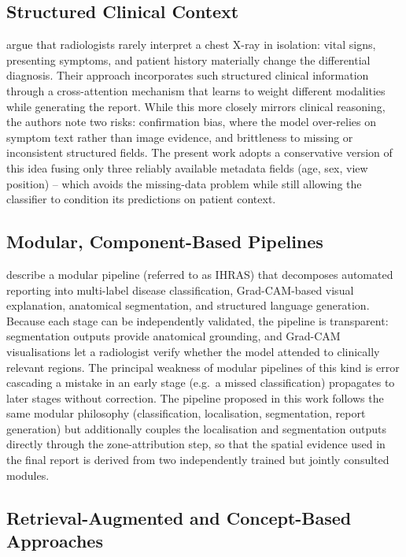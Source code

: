 \documentclass[preprint,12pt,authoryear]{elsarticle}
\begin{document}
\subsection{Structured Clinical Context}

\citet{integrative_multimodal} argue that radiologists rarely interpret a chest X-ray in isolation: vital signs, presenting symptoms, and patient history materially change the differential diagnosis. Their approach incorporates such structured clinical information through a cross-attention mechanism that learns to weight different modalities while generating the report. While this more closely mirrors clinical reasoning, the authors note two risks: confirmation bias, where the model over-relies on symptom text rather than image evidence, and brittleness to missing or inconsistent structured fields. The present work adopts a conservative version of this idea fusing only three reliably available metadata fields (age, sex, view position) -- which avoids the missing-data problem while still allowing the classifier to condition its predictions on patient context.

\subsection{Modular, Component-Based Pipelines}

\citet{ihras} describe a modular pipeline (referred to as IHRAS) that decomposes automated reporting into multi-label disease classification, Grad-CAM-based visual explanation, anatomical segmentation, and structured language generation. Because each stage can be independently validated, the pipeline is transparent: segmentation outputs provide anatomical grounding, and Grad-CAM visualisations let a radiologist verify whether the model attended to clinically relevant regions. The principal weakness of modular pipelines of this kind is error cascading a mistake in an early stage (e.g.\ a missed classification) propagates to later stages without correction. The pipeline proposed in this work follows the same modular philosophy (classification, localisation, segmentation, report generation) but additionally couples the localisation and segmentation outputs directly through the zone-attribution step, so that the spatial evidence used in the final report is derived from two independently trained but jointly consulted modules.

\subsection{Retrieval-Augmented and Concept-Based Approaches}
\end{document}
